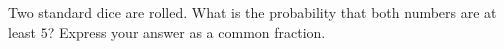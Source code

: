 Two standard dice are rolled. What is the probability that both numbers are at least $5$? Express your answer as a common fraction.

